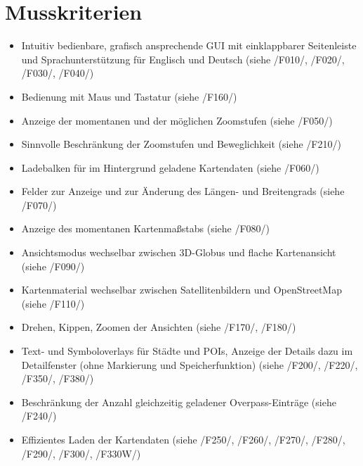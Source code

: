 \documentclass[10pt]{scrreprt}
\newcommand{\ziel}[1]{{\fontsize{9.5}{11}\textsf{/#1/}}}
\begin{document}
\section{Musskriterien}
\begin{itemize}
\item Intuitiv bedienbare, grafisch ansprechende GUI mit einklappbarer Seitenleiste und Sprachunterstützung für Englisch und Deutsch (siehe \ziel{F010}, \ziel{F020}, \ziel{F030}, \ziel{F040})
\item Bedienung mit Maus und Tastatur (siehe \ziel{F160})
\item Anzeige der momentanen und der möglichen Zoomstufen (siehe \ziel{F050})
\item Sinnvolle Beschränkung der Zoomstufen und Beweglichkeit (siehe \ziel{F210})
\item Ladebalken für im Hintergrund geladene Kartendaten (siehe \ziel{F060})
\item Felder zur Anzeige und zur Änderung des Längen- und Breitengrads (siehe \ziel{F070})
\item Anzeige des momentanen Kartenmaßstabs (siehe \ziel{F080})
\item Ansichtsmodus wechselbar zwischen 3D-Globus und flache Kartenansicht (siehe \ziel{F090})
\item Kartenmaterial wechselbar zwischen Satellitenbildern und OpenStreetMap (siehe \ziel{F110})
\item Drehen, Kippen, Zoomen der Ansichten (siehe \ziel{F170}, \ziel{F180})
\item Text- und Symboloverlays für Städte und POIs, Anzeige der Details dazu im Detailfenster (ohne Markierung und Speicherfunktion) (siehe \ziel{F200}, \ziel{F220}, \ziel{F350}, \ziel{F380})
\item Beschränkung der Anzahl gleichzeitig geladener Overpass-Einträge (siehe \ziel{F240})
\item Effizientes Laden der Kartendaten (siehe \ziel{F250}, \ziel{F260}, \ziel{F270}, \ziel{F280}, \ziel{F290}, \ziel{F300}, \ziel{F330W})
\end{itemize}
\end{document}
